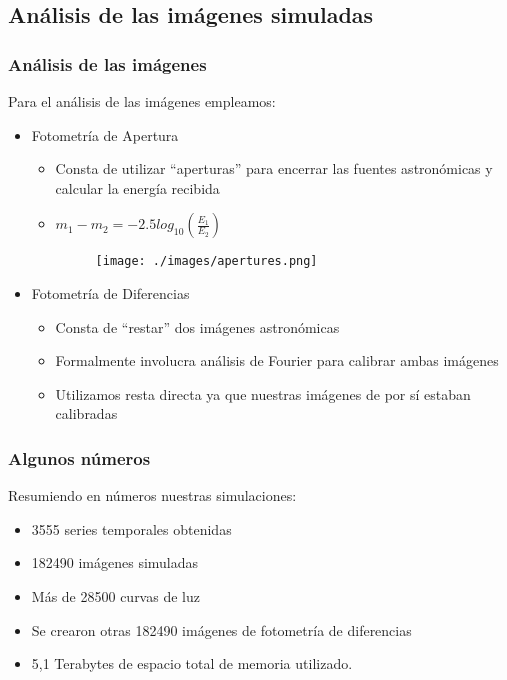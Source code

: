 \documentclass[10pt]{beamer}
\begin{document}
\subsection{An\'alisis de las im\'agenes simuladas}
\begin{frame}\frametitle{An\'alisis de las im\'agenes}
Para el an\'alisis de las im\'agenes empleamos:
\begin{itemize}
 \item Fotometr\'{i}a de Apertura \pause
 \begin{itemize}
  \item Consta de utilizar ``aperturas'' para encerrar las fuentes astron\'omicas y calcular
  la energ\'{i}a recibida %
  \item $m_1 - m_2 = -2.5 log_{10}\left(\frac{E_1}{E_2}\right)$ %
\begin{figure}
  \begin{center}
 \texttt{[image: ./images/apertures.png]}
\end{center}
\end{figure}
 \end{itemize}
 \item Fotometr\'{i}a de Diferencias \pause
 \begin{itemize}
  \item Consta de ``restar'' dos im\'agenes astron\'omicas%
  \item Formalmente involucra an\'alisis de Fourier para calibrar ambas im\'agenes%
  \item Utilizamos resta directa ya que nuestras im\'agenes de por s\'{i} estaban calibradas%
 \end{itemize}
\end{itemize}
\end{frame}
\begin{frame}\frametitle{Algunos n\'umeros}
Resumiendo en n\'umeros nuestras simulaciones:
\begin{itemize}%
\item 3555 series temporales obtenidas
\item 182490 im\'agenes simuladas
\item M\'as de 28500 curvas de luz
\item Se crearon otras 182490 im\'agenes de fotometr\'{i}a de diferencias
\item 5,1 Terabytes de espacio total de memoria utilizado.
\end{itemize}
\end{frame}
\end{document}
